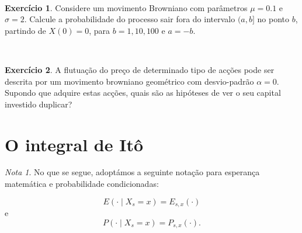 \documentclass[
  11pt,
  a4paper,
]{book}
\theoremstyle{definition}
\theoremstyle{definition}
\theoremstyle{definition}
\newtheorem{exercise}{Exercício}[chapter]
\theoremstyle{definition}
\theoremstyle{remark}
\newtheorem*{remark}{Nota }
\begin{document}
\(\,\)

\begin{exercise}
\leavevmode

Considere um movimento Browniano com parâmetros \(\mu=0.1\) e \(\sigma =2\). Calcule a probabilidade do processo sair fora do intervalo \((a,b]\) no ponto \(b\), partindo de \(X(0)=0\), para \(b=1,10,100\) e \(a=-b\).

\end{exercise}

\(\,\)

\begin{exercise}
\leavevmode

A flutuação do preço de determinado tipo de acções pode ser descrita por um movimento browniano geométrico com desvio-padrão \(\alpha = 0\). Supondo que adquire estas acções, quais são as hipóteses de ver o seu capital investido duplicar?

\end{exercise}

\section{O integral de Itô}\label{o-integral-de-ituxf4}

\begin{remark}
No que se segue, adoptámos a seguinte notação para esperança matemática e probabilidade condicionadas:

\[E(\cdot \mid X_s=x)=E_{s,x}(\cdot)\]
e
\[P(\cdot \mid X_s=x)=P_{s,x}(\cdot).\]
\end{remark}

\(\,\)
\end{document}

